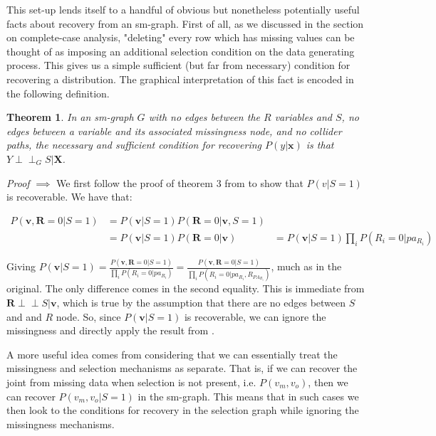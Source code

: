 \documentclass[12pt,twoside]{reedthesis}
\newtheorem{theorem}{Theorem}
\theoremstyle{definition}
\newcommand{\dsep}{\perp \!\!\!\perp}
\begin{document}
This set-up lends itself to a handful of obvious but nonetheless potentially useful facts about recovery from an sm-graph. First of all, as we discussed in the section on complete-case analysis, "deleting" every row which has missing values can be thought of as imposing an additional selection condition on the data generating process. This gives us a simple sufficient (but far from necessary) condition for recovering a distribution. The graphical interpretation of this fact is encoded in the following definition.


\begin{theorem}
In an sm-graph $G$ with no edges between the $R$ variables and $S$,  no edges between a variable and its associated missingness node, and no collider paths, the necessary and sufficient condition for recovering $P(y | \mathbf{x})$ is that $Y \dsep_G S | \mathbf{X}$.
\end{theorem}

\emph{Proof} $\implies$ We first follow the proof of theorem $3$ from \cite{Mohan_2019} to show that $P(v | S = 1)$ is recoverable. We have that:

\begin{align*}
P(\mathbf{v},  \mathbf{R} = 0 | S = 1) &= P(\mathbf{v} | S = 1) P(\mathbf{R} = 0 | \mathbf{v}, S = 1) \\
&= P(\mathbf{v} | S = 1) P(\mathbf{R} = 0 | \mathbf{v})
&= P(\mathbf{v} | S = 1) \prod_i P(R_i = 0 | pa_{R_i})
\end{align*}

Giving $P(\mathbf{v} | S = 1) = \frac{P(\mathbf{v},  \mathbf{R} = 0 | S = 1)}{\prod_i P(R_i = 0 | pa_{R_i})} = \frac{P(\mathbf{v},  \mathbf{R} = 0 | S = 1)}{\prod_i P(R_i = 0 | pa_{R_i}, R_{PA_{R_i}})} $, much as in the original. The only difference comes in the second equality.  This is immediate from $\mathbf{R}  \dsep S | \mathbf{v}$, which is true by the assumption that there are no edges between $S$ and and $R$ node. So, since $P(\mathbf{v} | S= 1)$ is recoverable, we can ignore the missingness and directly apply the result from \citep{Bareinboim_2014}.






A more useful idea comes from considering that we can essentially treat the missingness and selection mechanisms as separate. That is, if we can recover the joint from missing data when selection is not present, i.e. $P(v_m, v_o )$, then we can recover $P(v_m, v_o | S = 1)$ in the sm-graph. This means that in such cases we then look to the conditions for recovery in the selection graph while ignoring the missingness mechanisms.
\end{document}
